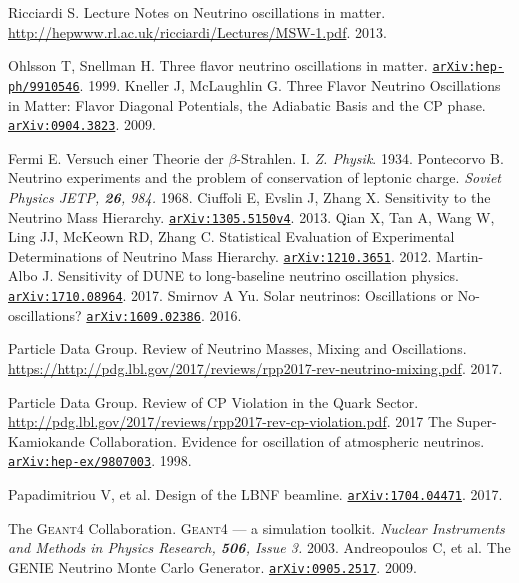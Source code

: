 \begin{thebibliography}{100}
	 Ricciardi S. Lecture Notes on Neutrino oscillations in
		matter.
		\url{http://hepwww.rl.ac.uk/ricciardi/Lectures/MSW-1.pdf}. 2013.

	 Ohlsson T, Snellman H. Three flavor neutrino oscillations
		in matter.
		\href{https://arxiv.org/abs/hep-ph/9910546v4}{\texttt{arXiv:hep-ph/9910546}}. 1999.
	 Kneller J, McLaughlin G. Three Flavor Neutrino Oscillations
		in Matter: Flavor Diagonal Potentials, the Adiabatic Basis and the CP
		phase. \href{https://arxiv.org/abs/0904.3823}{\texttt{arXiv:0904.3823}}. 2009.

	 Fermi E. Versuch einer Theorie der $\beta$-Strahlen. I.
		\textit{Z. Physik}. 1934.
	 Pontecorvo B. Neutrino experiments and the problem of
		conservation of leptonic charge. \textit{Soviet Physics JETP, \textbf{26},
		984.} 1968.
	 Ciuffoli E, Evslin J, Zhang X. Sensitivity to the
		Neutrino Mass Hierarchy.
		\href{https://arxiv.org/abs/1305.5150v4}{\texttt{arXiv:1305.5150v4}}. 2013.
	 Qian X, Tan A, Wang W, Ling JJ, McKeown RD, Zhang C.
		Statistical Evaluation of Experimental Determinations of Neutrino Mass
		Hierarchy.
		\href{https://arxiv.org/abs/1210.3651}{\texttt{arXiv:1210.3651}}. 2012.
	 Martin-Albo J. Sensitivity of DUNE to long-baseline
		neutrino oscillation physics.
		\href{https://arxiv.org/abs/1710.08964}{\texttt{arXiv:1710.08964}}. 2017.
	 Smirnov A Yu. Solar neutrinos: Oscillations or
		No-oscillations?
		\href{https://arxiv.org/abs/1609.02386}{\texttt{arXiv:1609.02386}}. 2016.

	 Particle Data Group. Review of Neutrino Masses, Mixing and
		Oscillations.
		\url{https://http://pdg.lbl.gov/2017/reviews/rpp2017-rev-neutrino-mixing.pdf}.
		2017.

	 Particle Data Group. Review of CP Violation in the Quark Sector.
		\url{http://pdg.lbl.gov/2017/reviews/rpp2017-rev-cp-violation.pdf}. 2017
	 The Super-Kamiokande Collaboration. Evidence for oscillation
		of atmospheric neutrinos.
		\href{https://arxiv.org/abs/hep-ex/9807003}{\texttt{arXiv:hep-ex/9807003}}. 1998.

	 Papadimitriou V, et al. Design of the LBNF beamline.
		\href{https://arxiv.org/abs/1704.04471}{\texttt{arXiv:1704.04471}}. 2017.

	 The \textsc{Geant4} Collaboration.
		\textsc{Geant4} --- a simulation toolkit. \textit{Nuclear Instruments and Methods in
		Physics Research, \textbf{506}, Issue 3.} 2003. 
	 Andreopoulos C, et al. The \textsc{GENIE} Neutrino Monte
		Carlo Generator.
		\href{https://arxiv.org/abs/0905.2517}{\texttt{arXiv:0905.2517}}. 2009.


\end{thebibliography}

